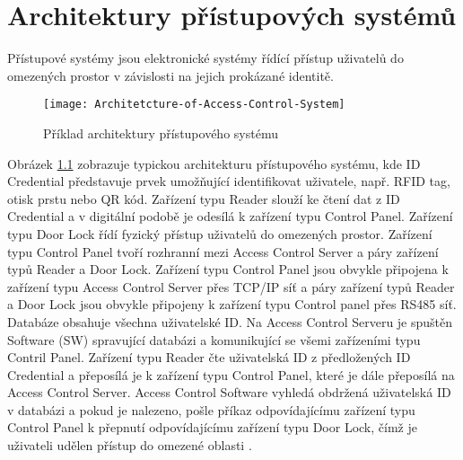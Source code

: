 \chapter{Architektury přístupových systémů}

Přístupové systémy jsou elektronické systémy řídící přístup uživatelů do omezených prostor v závislosti na jejich prokázané identitě.

\begin{figure}[!h]
    \centering
    \texttt{[image: Architetcture-of-Access-Control-System]}
    \caption{Příklad architektury přístupového systému \cite{accessControlSystem_eiprocus}}
    \label{fig:Access control system architecture}
\end{figure}

Obrázek \ref{fig:Access control system architecture} zobrazuje typickou architekturu přístupového systému, kde ID Credential představuje prvek umožňující identifikovat uživatele, např. RFID tag, otisk prstu nebo QR kód. 
Zařízení typu Reader slouží ke čtení dat z ID Credential a v digitální podobě je odesílá k zařízení typu Control Panel.
Zařízení typu Door Lock řídí fyzický přístup uživatelů do omezených prostor. 
Zařízení typu Control Panel tvoří rozhranní mezi Access Control Server a páry zařízení typů Reader a Door Lock. 
Zařízení typu Control Panel jsou obvykle připojena 
k zařízení typu Access Control Server přes TCP/IP síť a páry zařízení typů Reader a Door Lock jsou obvykle připojeny k zařízení typu Control panel přes RS485 síť. Databáze obsahuje všechna uživatelské ID.
Na Access Control Serveru je spuštěn Software (SW) spravující databázi a komunikující se všemi zařízeními typu Contril Panel.
Zařízení typu Reader čte uživatelská ID z předložených ID Credential a přeposílá je k zařízení typu Control Panel, které je dále přeposílá na Access Control Server. 
Access Control Software vyhledá obdržená uživatelská ID v databázi a pokud je nalezeno, pošle příkaz odpovídajícímu zařízení typu Control Panel k přepnutí odpovídajícímu zařízení typu Door Lock, čímž je uživateli udělen přístup do omezené oblasti \cite{accessControlSystem_eiprocus}.
